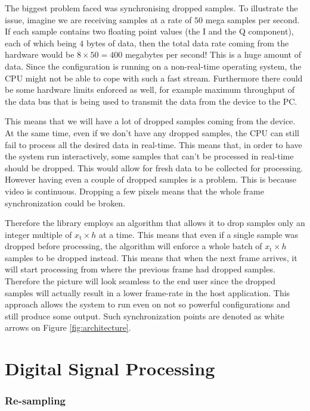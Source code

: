 \documentclass[a4paper,12pt,twoside,openright]{report}
\begin{document}
The biggest problem faced was synchronising dropped samples. To illustrate the issue, imagine we are receiving samples at a rate of $50$ mega samples per second. If each sample contains two floating point values (the I and the Q component), each of which being $4$ bytes of data, then the total data rate coming from the hardware would be $8 \times 50 = 400$ megabytes per second! This is a huge amount of data. Since the configuration is running on a non-real-time operating system, the CPU might not be able to cope with such a fast stream. Furthermore there could be some hardware limits enforced as well, for example maximum throughput of the data bus that is being used to transmit the data from the device to the PC.

This means that we will have a lot of dropped samples coming from the device. At the same time, even if we don't have any dropped samples, the CPU can still fail to process all the desired data in real-time. This means that, in order to have the system run interactively, some samples that can't be processed in real-time should be dropped. This would allow for fresh data to be collected for processing. However having even a couple of dropped samples is a problem. This is because video is continuous. Dropping a few pixels means that the whole frame synchronization could be broken.

Therefore the library employs an algorithm that allows it to drop samples only an integer multiple of $x_\text{t} \times h$ at a time. This means that even if a single sample was dropped before processing, the algorithm will enforce a whole batch of $x_\text{t} \times h$ samples to be dropped instead. This means that when the next frame arrives, it will start processing from where the previous frame had dropped samples. Therefore the picture will look seamless to the end user since the dropped samples will actually result in a lower frame-rate in the host application. This approach allows the system to run even on not so powerful configurations and still produce some output. Such synchronization points are denoted as white arrows on Figure \ref{fig:architecture}.

\section{Digital Signal Processing}

\subsubsection{Re-sampling}
\end{document}
